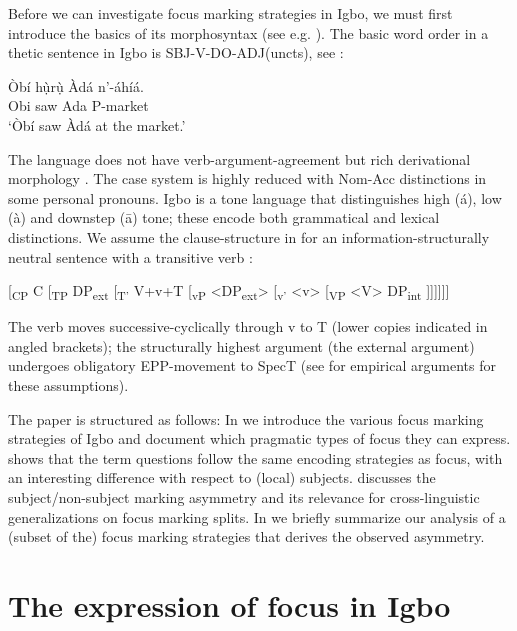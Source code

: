 \documentclass[output=paper,colorlinks,citecolor=brown]{langscibook}
\begin{document}
Before we can investigate focus marking strategies in Igbo, we must first introduce the basics of its morphosyntax (see e.g. \citealt{GreenIgwe1963, Carrel1970, Manfredi1991, Mbah2006, Emenanjo2015}). The basic word order in a thetic sentence in Igbo is SBJ-V-DO-ADJ(uncts), see :

\ea%
    \label{ex:amaechi:1}
    \gll    Òbí hụ̀rụ̀ Àdá n'-áhíá.\\
            Obi saw Ada P-market\\
    \glt    `Òbí saw Àdá at the market.'
\z

The language does not have verb-argument-agreement but rich derivational morphology \citep{Uwalaka1988}. The case system is highly reduced with Nom-Acc distinctions in some personal pronouns. Igbo is a tone language that distinguishes high (\'a), low (\`a) and downstep (\=a) tone; these encode both grammatical and lexical distinctions. We assume the clause-structure in  for an information-structurally neutral sentence with a transitive verb \citep{AmaechiGeorgi2019}:

\ea%
    \label{ex:amaechi:2}
    [\textsubscript{CP} C [\textsubscript{{TP}} DP\textsubscript{{ext}} [\textsubscript{{T'}} V+v+T [\textsubscript{{vP}} <DP\textsubscript{{ext}}> [\textsubscript{v'} <v> [\textsubscript{VP} <V> DP\textsubscript{{int}} ]]]]]]
\z

The verb moves successive-cyclically through v to T (lower copies indicated in angled brackets); the structurally highest argument (the external argument) undergoes obligatory EPP-movement to SpecT (see \citealt{AmaechiGeorgi2019} for empirical arguments for these assumptions).

The paper is structured as follows: In  we introduce the various focus marking strategies of Igbo and document which pragmatic types of focus they can express.  shows that the term questions follow the same encoding strategies as focus, with an interesting difference with respect to (local) subjects.  discusses the subject/non-subject marking asymmetry and its relevance for cross-linguistic generalizations on focus marking splits. In  we briefly summarize our analysis of a (subset of the) focus marking strategies that derives the observed asymmetry.

\section{The expression of focus in Igbo}\label{sec:amaechi:2}
\end{document}
